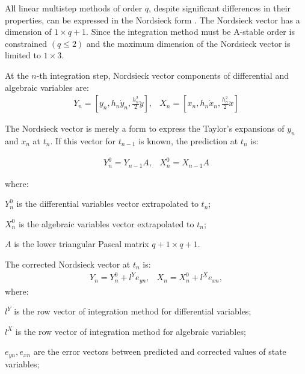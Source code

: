 \documentclass[lettersize,journal]{IEEEtran}
\begin{document}
All linear multistep methods of order \(q\), despite significant differences in their properties, can be expressed in the Nordsieck form \cite{hairer93}. The Nordsieck vector has a dimension of \(1 \times q+1\). Since the integration method must be A-stable order is constrained \((q \leq 2)\) and the maximum dimension of the Nordsieck vector is limited to \(1 \times 3\). 

At the \(n\)-th integration step, Nordsieck vector components of differential and algebraic variables are:
\begin{equation}
	\label{eqn_nords}
	\begin{array}{cc}
		Y_n=\left[y_n, h_n \dot{y}_n, \frac{h_n^2}{2} \ddot{y}\right], &
		X_n=\left[x_n, h_n \dot{x}_n, \frac{h_n^2}{2} \ddot{x}\right] 
	\end{array}
\end{equation}

The Nordsieck vector is merely a form to express the Taylor's expansions of \(y_n\) and \(x_n\) at \(t_n\). If this vector for \(t_{n-1}\) is known, the prediction at \(t_n\) is:

\begin{equation}
	\label{eqn_predictor}
	\begin{array}{cc}
		Y_n^0=Y_{n-1}A, &
		X_n^0=X_{n-1}A
	\end{array}
\end{equation}

\noindent where:
\begin{description}
	\item  \(Y_n^0\) is the differential variables vector extrapolated to \(t_n\);
	\item  \(X_n^0\) is the algebraic variables vector extrapolated to \(t_n\);
	\item  \(A\) is the lower triangular Pascal matrix \(q+1 \times q+1\).
\end{description}

The corrected Nordsieck vector at \(t_n\) is: 
\begin{equation}
	\label{eqn_corrector}
	\begin{array}{cc}
		Y_n=Y_n^0 +l^Ye_{yn}, &
		X_n=X_n^0 +l^Xe_{xn},
	\end{array}
\end{equation}
\noindent where:
\begin{description}
	\item  \(l^Y\) is the row vector of integration method for differential variables;
	\item  \(l^X\) is the row vector of integration method for algebraic variables;
	\item  \(e_{yn}, e_{xn}\) are the error vectors between predicted and corrected values of state variables;
\end{description}
\end{document}
